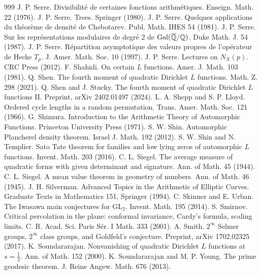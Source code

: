 \begin{thebibliography}{999}
 J. P. Serre. Divisibilit\'e de certaines fonctions arithm\'etiques. Enseign. Math. 22 (1976).
 J. P. Serre. Trees. Springer (1980).
 J. P. Serre. Quelques applications du th\'eor\`eme de densit\'e de Chebotarev. Publ. Math. IHES 54 (1981).
 J. P. Serre. Sur les repr\'esentations modulaires de degr\'e 2 de $\operatorname{Gal}(\overline{\mathbb{Q}}/\mathbb{Q})$. Duke Math. J. 54 (1987).
 J. P. Serre. R\'epartition asymptotique des valeurs propres de l'op\'erateur de Hecke $T_p$. J. Amer. Math. Soc. 10 (1997).
 J. P. Serre. Lectures on $N_X(p)$. CRC Press (2012).
 F. Shahidi. On certain $L$ functions. Amer. J. Math. 103 (1981).
 Q. Shen. The fourth moment of quadratic Dirichlet $L$ functions. Math. Z. 298 (2021).
 Q. Shen and J. Stucky. The fourth moment of quadratic Dirichlet $L$ functions II. Preprint, arXiv 2402.01497 (2024).
 L. A. Shepp and S. P. Lloyd. Ordered cycle lengths in a random permutation. Trans. Amer. Math. Soc. 121 (1966).
 G. Shimura. Introduction to the Arithmetic Theory of Automorphic Functions. Princeton University Press (1971).
 S. W. Shin. Automorphic Plancherel density theorem. Israel J. Math. 192 (2012).
 S. W. Shin and N. Templier. Sato Tate theorem for families and low lying zeros of automorphic $L$ functions. Invent. Math. 203 (2016).
 C. L. Siegel. The average measure of quadratic forms with given determinant and signature. Ann. of Math. 45 (1944).
 C. L. Siegel. A mean value theorem in geometry of numbers. Ann. of Math. 46 (1945).
 J. H. Silverman. Advanced Topics in the Arithmetic of Elliptic Curves. Graduate Texts in Mathematics 151, Springer (1994).
 C. Skinner and E. Urban. The Iwasawa main conjectures for $\mathrm{GL}_2$. Invent. Math. 195 (2014).
 S. Smirnov. Critical percolation in the plane: conformal invariance, Cardy's formula, scaling limits. C. R. Acad. Sci. Paris S\'er. I Math. 333 (2001).
 A. Smith. $2^\infty$ Selmer groups, $2^\infty$ class groups, and Goldfeld's conjecture. Preprint, arXiv 1702.02325 (2017).
 K. Soundararajan. Nonvanishing of quadratic Dirichlet $L$ functions at $s=\frac12$. Ann. of Math. 152 (2000).
 K. Soundararajan and M. P. Young. The prime geodesic theorem. J. Reine Angew. Math. 676 (2013).

\end{thebibliography}
